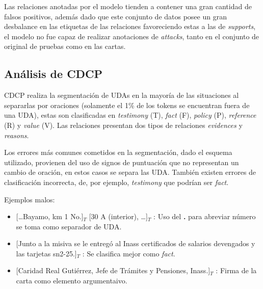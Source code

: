 \documentclass[a4paper,11pt,twocolumn,twoside]{article}
\begin{document}
Las relaciones anotadas por el modelo tienden a contener una gran cantidad de falsos positivos, además
dado que este conjunto de datos posee un gran desbalance en las etiquetas de las relaciones favoreciendo 
estas a las de \textit{supports}, el modelo no fue capaz de realizar anotaciones de \textit{attacks}, tanto en 
el conjunto de original de pruebas como en las cartas.

\subsection{Análisis de CDCP}


CDCP realiza la segmentación de UDAs en la mayoría de las situaciones al separarlas por oraciones 
(solamente el 1\% de los tokens se encuentran fuera de una UDA),
estas son clasificadas en \textit{testimony} (T), \textit{fact} (F), \textit{policy} (P), \textit{reference} (R)
y \textit{value} (V). Las relaciones presentan dos tipos de relaciones \textit{evidences} y \textit{reasons}.

Los errores más comunes cometidos en la segmentación, dado el esquema utilizado, provienen del uso 
de signos de puntuación que no representan un cambio de oración, en estos casos se separa las UDA. También
existen errores de clasificación incorrecta, de, por ejemplo, \textit{testimony} que podrían ser \textit{fact}.

Ejemplos malos:
\begin{itemize}
	\item \text{} [\dots Bayamo, km 1 No.]$_T$ [30 A (interior), \dots]$_T$
	      : Uso del \textbf{.} para abreviar número se toma como separador de UDA. %
	\item \text{} [Junto a la misiva se le entregó al Inass certificados de salarios devengados y las tarjetas sn2-25.]$_T$
	      : Se clasifica mejor como \textit{fact}. %
	\item \text{} [Caridad Real Gutiérrez, Jefe de Trámites y Pensiones, Inass.]$_T$
	      : Firma de la carta como elemento argumentaivo. %
\end{itemize}
\end{document}
